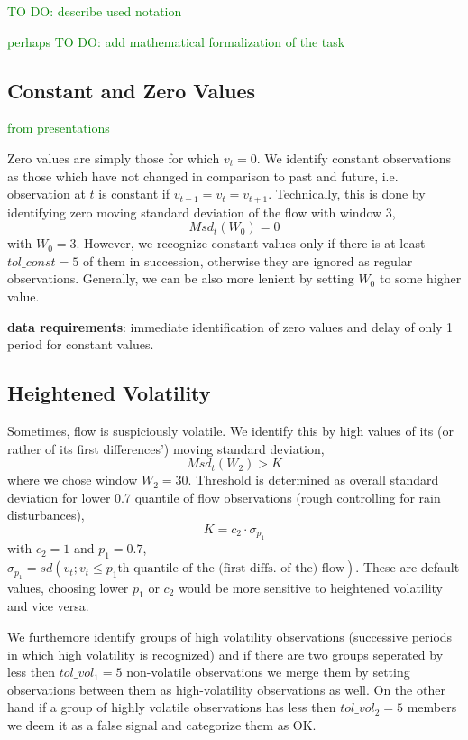 \documentclass[12pt,a4paper]{article}
\begin{document}
\textcolor{green}{TO DO: describe used notation}

\textcolor{green}{perhaps TO DO: add mathematical formalization of the task}

\subsection{Constant and Zero Values}
\textcolor{green}{from presentations}

Zero values are simply those for which $v_t = 0$. We identify constant observations as those which have not changed in comparison to past and future, i.e. observation at $t$ is constant if $v_{t-1} = v_t = v_{t+1}$. Technically, this is done by identifying zero moving standard deviation of the flow  with window 3,
$$ Msd_t(W_0) = 0 $$
with $W_0 = 3$. However, we recognize constant values only if there is at least $tol\_const = 5$ of them in succession, otherwise they are ignored as regular observations. Generally, we can be also more lenient by setting $W_0$ to some higher value.

\textbf{data requirements}: immediate identification of zero values and delay of only 1 period for constant values.

\subsection{Heightened Volatility}
Sometimes, flow is suspiciously volatile. We identify this by high values of its (or rather of its first differences') moving standard deviation,
$$ Msd_t(W_2) > K $$
where we chose window $W_2 = 30$. Threshold is determined as overall standard deviation for lower 0.7 quantile of flow observations (rough controlling for rain disturbances),
$$ K = c_2 \cdot \sigma_{p_1} $$
with $c_2 = 1$ and $p_1 = 0.7$, $\sigma_{p_1} = sd(v_t; v_t \leq p_1\text{th quantile of the (first diffs. of the) flow})$. These are default values, choosing lower $p_1$ or $c_2$ would be more sensitive to heightened volatility and vice versa.

We furthemore identify groups of high volatility observations (successive periods in which high volatility is recognized) and if there are two groups seperated by less then $tol\_vol_1 = 5$ non-volatile observations we merge them by setting observations between them as high-volatility observations as well. On the other hand if a group of highly volatile observations has less then $tol\_vol_2 = 5$ members we deem it as a false signal and categorize them as OK.
\end{document}
